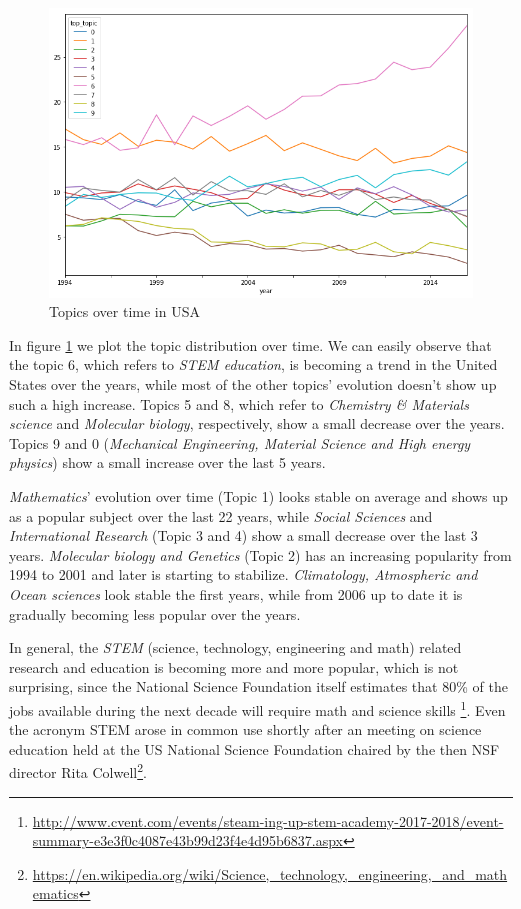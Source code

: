 \documentclass[12pt]{report}
\begin{document}
\begin{figure}[H]
\centering
\includegraphics[width=1.0\textwidth]
{figs/topic-evolution-usa.png}
\caption{Topics over time in USA}
\label{usatrend}
\end{figure}

In figure \ref{usatrend} we plot the topic distribution over time. We can easily
observe that the topic 6, which refers to \emph{STEM education}, is becoming
a trend in the United States over the years, while most of the other
topics' evolution doesn't show up such a high increase. Topics 5 and
8, which refer to \emph{Chemistry \& Materials science} and \emph{Molecular
biology}, respectively, show a small decrease over the years. Topics 9
and 0 (\emph{Mechanical Engineering, Material Science and High energy
physics}) show a small increase over the last 5 years. 

\emph{Mathematics}'
evolution over time (Topic 1) looks stable on average and shows up as
a popular subject over the last 22 years, while \emph{Social Sciences} and
\emph{International Research} (Topic 3 and 4) show a small decrease over the
last 3 years. \emph{Molecular biology and Genetics} (Topic 2) has an
increasing popularity from 1994 to 2001 and later is starting to
stabilize. \emph{Climatology, Atmospheric and Ocean sciences} look stable the
first years, while from 2006 up to date it is gradually becoming less
popular over the years.

In general, the \emph{STEM} (science, technology, engineering and math)
related research and education is becoming more and more popular,
which is not surprising, since the National Science Foundation itself
estimates that 80\%
 of the jobs available during the next decade
will require math and science skills \footnote{\url{http://www.cvent.com/events/steam-ing-up-stem-academy-2017-2018/event-summary-e3e3f0c4087e43b99d23f4e4d95b6837.aspx}}. Even the acronym STEM arose in common use shortly after an   meeting on 
science education held at the US National Science Foundation chaired by the then 
NSF director Rita Colwell\footnote{\url{https://en.wikipedia.org/wiki/Science,_technology,_engineering,_and_mathematics}}.
\end{document}
